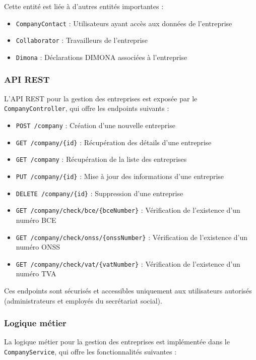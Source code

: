 Cette entité est liée à d'autres entités importantes :
\begin{itemize}
  \item \texttt{CompanyContact} : Utilisateurs ayant accès aux données de l'entreprise
  \item \texttt{Collaborator} : Travailleurs de l'entreprise
  \item \texttt{Dimona} : Déclarations DIMONA associées à l'entreprise
\end{itemize}

\subsubsection{API REST}

L'API REST pour la gestion des entreprises est exposée par le \texttt{CompanyController}, qui offre les endpoints suivants :

\begin{itemize}
  \item \texttt{POST /company} : Création d'une nouvelle entreprise
  \item \texttt{GET /company/\{id\}} : Récupération des détails d'une entreprise
  \item \texttt{GET /company} : Récupération de la liste des entreprises
  \item \texttt{PUT /company/\{id\}} : Mise à jour des informations d'une entreprise
  \item \texttt{DELETE /company/\{id\}} : Suppression d'une entreprise
  \item \texttt{GET /company/check/bce/\{bceNumber\}} : Vérification de l'existence d'un numéro BCE
  \item \texttt{GET /company/check/onss/\{onssNumber\}} : Vérification de l'existence d'un numéro ONSS
  \item \texttt{GET /company/check/vat/\{vatNumber\}} : Vérification de l'existence d'un numéro TVA
\end{itemize}

Ces endpoints sont sécurisés et accessibles uniquement aux utilisateurs autorisés (administrateurs et employés du secrétariat social).

\subsubsection{Logique métier}

La logique métier pour la gestion des entreprises est implémentée dans le \texttt{CompanyService}, qui offre les fonctionnalités suivantes :

